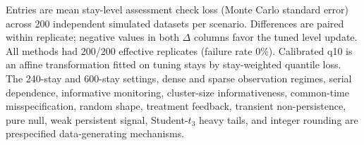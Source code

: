 \begin{table}[!htbp]
\caption{Extended ADEMP simulation with strong comparators and Monte Carlo precision.}
\label{tab:ademp_v2_summary}
\centering
\small
{}
\par\smallskip
\footnotesize{Entries are mean stay-level assessment check loss (Monte Carlo standard error) across 200 independent simulated datasets per scenario. Differences are paired within replicate; negative values in both $\Delta$ columns favor the tuned level update. All methods had 200/200 effective replicates (failure rate 0\%). Calibrated q10 is an affine transformation fitted on tuning stays by stay-weighted quantile loss. The 240-stay and 600-stay settings, dense and sparse observation regimes, serial dependence, informative monitoring, cluster-size informativeness, common-time misspecification, random shape, treatment feedback, transient non-persistence, pure null, weak persistent signal, Student-$t_3$ heavy tails, and integer rounding are prespecified data-generating mechanisms.}
\end{table}
